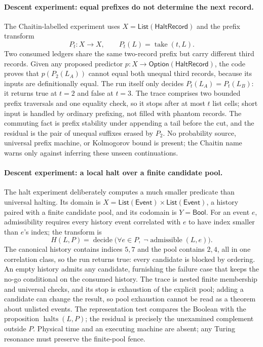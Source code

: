 \paragraph{Descent experiment: equal prefixes do not determine the next record.}
The Chaitin-labelled experiment uses \(X=\mathsf{List}(\mathsf{HaltRecord})\) and the prefix transform
\[
 P_t:X\longrightarrow X,
 \qquad P_t(L)=\operatorname{take}(t,L).
\]
Two consumed ledgers share the same two-record prefix but carry different third records.
Given any proposed predictor \(p:X\to\mathsf{Option}(\mathsf{HaltRecord})\), the code proves that \(p(P_2(L_A))\) cannot equal both unequal third records, because its inputs are definitionally equal.
The run itself only decides \(P_t(L_A)=P_t(L_B)\): it returns true at \(t=2\) and false at \(t=3\).
The trace comprises two bounded prefix traversals and one equality check, so it stops after at most \(t\) list cells; short input is handled by ordinary prefixing, not filled with phantom records.
The commuting fact is prefix stability under appending a tail before the cut, and the residual is the pair of unequal suffixes erased by \(P_2\).
No probability source, universal prefix machine, or Kolmogorov bound is present; the Chaitin name warns only against
inferring these unseen continuations.

\paragraph{Descent experiment: a local halt over a finite candidate pool.}
The halt experiment deliberately computes a much smaller predicate than universal halting.
Its domain is \(X=\mathsf{List}(\mathsf{Event})\times\mathsf{List}(\mathsf{Event})\), a history paired with a finite candidate pool, and its codomain is \(Y=\mathsf{Bool}\).
For an event \(e\), admissibility requires every history event correlated with \(e\) to have index smaller than \(e\)'s index; the transform is
\[
 H(L,P)=\operatorname{decide}\bigl(\forall e\in P,\;\neg\operatorname{admissible}(L,e)\bigr).
\]
The canonical history contains indices \(5,7\) and the pool contains \(2,4\), all in one correlation class, so the run returns true: every candidate is blocked by ordering.
An empty history admits any candidate, furnishing the failure case that keeps the no-go conditional on the consumed history.
The trace is nested finite membership and universal checks, and its stop is exhaustion of the explicit pool; adding a candidate can change the result, so pool exhaustion cannot be read as a theorem about unlisted events.
The representation test compares the Boolean with the proposition \(\operatorname{halts}(L,P)\); the residual is precisely the unexamined complement outside \(P\).
Physical time and an executing machine are absent; any Turing resonance must preserve the finite-pool fence.

